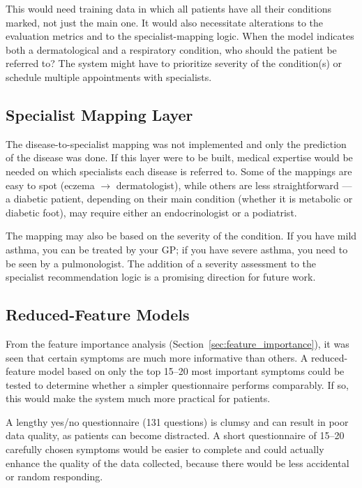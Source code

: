 This would need training data in which all patients have all their conditions marked, not just the main one. It would also necessitate alterations to the evaluation metrics and to the specialist-mapping logic. When the model indicates both a dermatological and a respiratory condition, who should the patient be referred to? The system might have to prioritize severity of the condition(s) or schedule multiple appointments with specialists.

\subsection{Specialist Mapping Layer}

The disease-to-specialist mapping was not implemented and only the prediction of the disease was done. If this layer were to be built, medical expertise would be needed on which specialists each disease is referred to. Some of the mappings are easy to spot (eczema $\rightarrow$ dermatologist), while others are less straightforward --- a diabetic patient, depending on their main condition (whether it is metabolic or diabetic foot), may require either an endocrinologist or a podiatrist.

The mapping may also be based on the severity of the condition. If you have mild asthma, you can be treated by your GP; if you have severe asthma, you need to be seen by a pulmonologist. The addition of a severity assessment to the specialist recommendation logic is a promising direction for future work.

\subsection{Reduced-Feature Models}

From the feature importance analysis (Section~\ref{sec:feature_importance}), it was seen that certain symptoms are much more informative than others. A reduced-feature model based on only the top 15--20 most important symptoms could be tested to determine whether a simpler questionnaire performs comparably. If so, this would make the system much more practical for patients.

A lengthy yes/no questionnaire (131 questions) is clumsy and can result in poor data quality, as patients can become distracted. A short questionnaire of 15--20 carefully chosen symptoms would be easier to complete and could actually enhance the quality of the data collected, because there would be less accidental or random responding.

